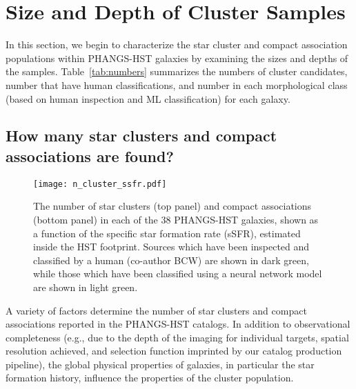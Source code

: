 \documentclass[linenumbers]{aastex63}
\begin{document}
\section{Size and Depth of Cluster Samples}\label{sect:catalog_properties}

%

%
In this section, we begin to characterize the star cluster and compact association populations within PHANGS-HST galaxies by examining the sizes and depths of the samples.  Table~\ref{tab:numbers} summarizes the numbers of cluster candidates, number that have human classifications, and number in each morphological class (based on human inspection and ML classification) for each galaxy.

\subsection{How many star clusters and compact associations are found?}\label{ssect:how_many_clusters}
%
\begin{figure}
\texttt{[image: n\_cluster\_ssfr.pdf]}
 \caption{The number of star clusters (top panel) and compact associations (bottom panel) in each of the 38 PHANGS-HST galaxies, shown as a function of the specific star formation rate (sSFR), estimated inside the HST footprint. Sources which have been inspected and classified by a human (co-author BCW) are shown in dark green, while those which have been classified using a neural network model \citep{hannon_star_2023} are shown in light green.}
 \label{fig:n_cluster_ssfr}
\end{figure}
% 

A variety of factors determine the number of star clusters and compact associations reported in the PHANGS-HST catalogs.
In addition to observational completeness (e.g., due to the depth of the imaging for individual targets, spatial resolution achieved, and selection function imprinted by our catalog production pipeline), the global physical properties of galaxies, in particular the star formation history, influence the properties of the cluster population. 
\end{document}

